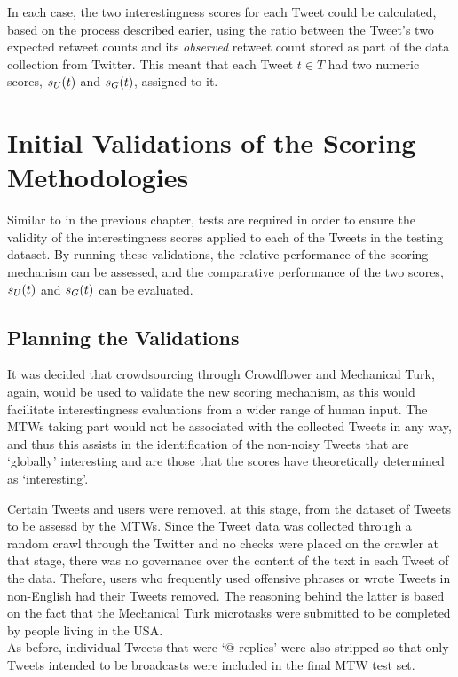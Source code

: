In each case, the two interestingness scores for each Tweet could be calculated, based on the process described earier, using the ratio between the Tweet's two expected retweet counts and its \textit{observed} retweet count stored as part of the data collection from Twitter. This meant that each Tweet $t \in T$ had two numeric scores, $s_U(t)$ and $s_G(t)$, assigned to it. 



\section{Initial Validations of the Scoring Methodologies}
Similar to in the previous chapter, tests are required in order to ensure the validity of the interestingness scores applied to each of the Tweets in the testing dataset. By running these validations, the relative performance of the scoring mechanism can be assessed, and the comparative performance of the two scores, $s_U(t)$ and $s_G(t)$ can be evaluated.


\subsection{Planning the Validations}
It was decided that crowdsourcing through Crowdflower and Mechanical Turk, again, would be used to validate the new scoring mechanism, as this would facilitate interestingness evaluations from a wider range of human input. The MTWs taking part would not be associated with the collected Tweets in any way, and thus this assists in the identification of the non-noisy Tweets that are `globally' interesting and are those that the scores have theoretically determined as `interesting'.

Certain Tweets and users were removed, at this stage, from the dataset of Tweets to be assessd by the MTWs. Since the Tweet data was collected through a random crawl through the Twitter and no checks were placed on the crawler at that stage, there was no governance over the content of the text in each Tweet of the data. Thefore, users who frequently used offensive phrases or wrote Tweets in non-English had their Tweets removed. The reasoning behind the latter is based on the fact that the Mechanical Turk microtasks were submitted to be completed by people living in the USA.\\
As before, individual Tweets that were `@-replies' were also stripped so that only Tweets intended to be broadcasts were included in the final MTW test set.


